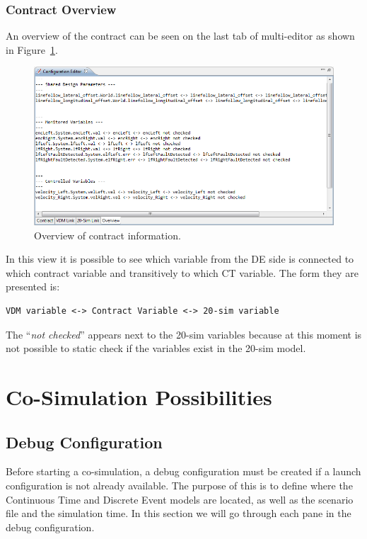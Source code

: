 \documentclass{crescendorepchap}
\begin{document}
\subsection{Contract Overview}

An overview of the contract can be seen on the last tab of multi-editor as shown in Figure~\ref{fig:ContractOverview}.

\begin{figure}[htbp]
\centering
\includegraphics[width=.8\textwidth]{images/ContractOverview.png}
\caption{Overview of contract information.\label{fig:ContractOverview}}
\end{figure}

In this view it is possible to see which variable from the DE side is
connected to which contract variable and transitively to which CT
variable. The form they are presented is:

\begin{verbatim}
VDM variable <-> Contract Variable <-> 20-sim variable
\end{verbatim}

The ``\emph{not checked}'' appears next to the 20-sim variables because at
this moment is not possible to static check if the variables exist in
the 20-sim model.


\chapter{Co-Simulation Possibilities}\label{chap:cosim}

\section{Debug Configuration}\label{sec:DebugConfigIntro}

Before starting a co-simulation, a debug configuration must be created
if a launch configuration is not already available.
The purpose of this is to define where the Continuous Time and Discrete
Event models are located, as well as the scenario file and the
simulation time. In this section we will go through each pane in the debug configuration.
\end{document}
